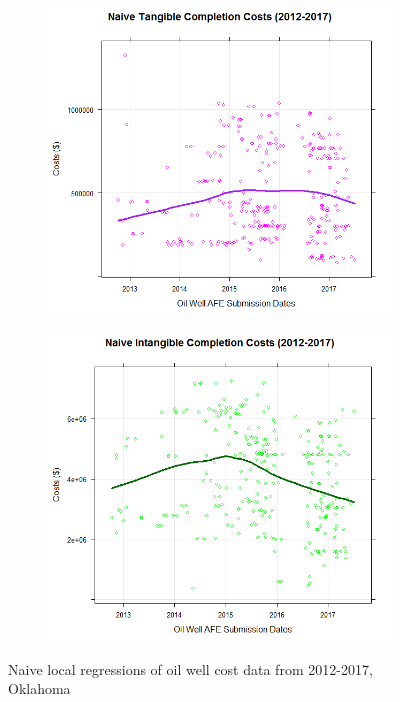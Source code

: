 \documentclass{article}
\begin{document}
\begin{enumerate}
\begin{figure}[h]
\label{fig:test}
\end{figure}
\\\\
\begin{figure}[h]
\centering
\begin{subfigure}{.5\textwidth}
  \centering
  \includegraphics[width=.8\linewidth]{NaiveTangibleCompletion}
  \label{fig:sub1}
\end{subfigure}%
\begin{subfigure}{.5\textwidth}
  \centering
  \includegraphics[width=.8\linewidth]{NaiveIntangibleCompletion}
  \label{fig:sub2}
\end{subfigure}
\caption{Naive local regressions of oil well cost data from 2012-2017, Oklahoma}
\label{fig:test}
\end{figure}

\end{enumerate}
\end{document}
